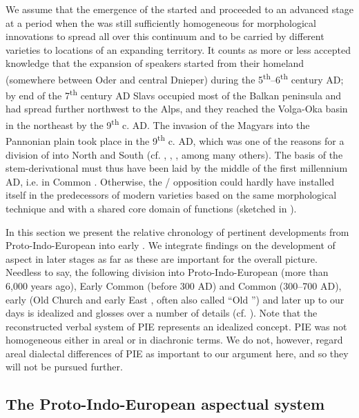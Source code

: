 \documentclass[output=paper]{langsci/langscibook}
\begin{document}
We assume that the emergence of the   started and proceeded to an advanced stage at a period when the   was still sufficiently homogeneous for morphological innovations to spread all over this continuum and to be carried by different  varieties to locations of an expanding territory. It counts as more or less accepted knowledge that the expansion of  speakers started from their homeland (somewhere between Oder and central Dnieper) during the 5\textsuperscript{th}–6\textsuperscript{th} century AD; by end of the 7\textsuperscript{th} century AD Slavs occupied most of the Balkan peninsula and had spread further northwest to the Alps, and they reached the Volga-Oka basin in the northeast by the 9\textsuperscript{th} c. AD. The invasion of the Magyars into the Pannonian plain took place in the 9\textsuperscript{th} c. AD, which was one of the reasons for a division of  into North and South (cf. \citealt[5–7]{Birnbaum1979}, \citealt[9–11]{Stieber1989}, \citealt[1123]{Holzer2014}, among many others). The basis of the stem-derivational  must thus have been laid by the middle of the first millennium AD, i.e. in Common . Otherwise, the / opposition could hardly have installed itself in the predecessors of modern  varieties based on the same morphological technique and with a shared core domain of functions (sketched in ).

In this section we present the relative chronology of pertinent developments from Proto-Indo-European into early . We integrate findings on the development of aspect in later stages as far as these are important for the overall picture. Needless to say, the following division into Proto-Indo-European (more than 6,000 years ago), Early Common  (before 300 AD) and Common  (300--700 AD), early  (Old Church  and early East , often also called “Old ”) and later  up to our days is idealized and glosses over a number of details (cf. \citealt[46]{Andersen2003}). Note that the reconstructed verbal system of PIE represents an idealized concept. PIE was not homogeneous either in areal or in diachronic terms. We do not, however, regard areal dialectal differences of PIE as important to our argument here, and so they will not be pursued further.

\subsection{The Proto-Indo-European aspectual system}\label{sec:wiemerserzant:3.1}
\end{document}
